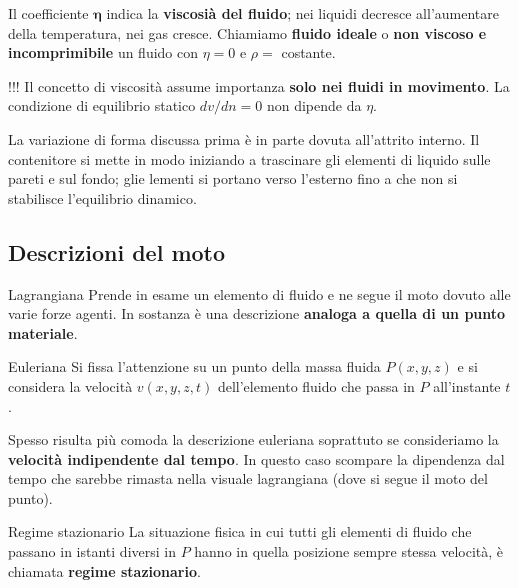 \documentclass[x11names]{report}
\begin{document}
	Il coefficiente \(\boldsymbol{\eta}\) indica la \textbf{viscosià del fluido}; nei liquidi decresce all'aumentare della temperatura, nei gas cresce. Chiamiamo \textbf{fluido ideale} o \textbf{non viscoso e incomprimibile} un fluido con \(\eta = 0\) e \(\rho = \) costante.
	
	\begin{center}
		\colorbox{attenzione}{\begin{minipage}{5.75in}
				\begin{attenzione}{!!!}
					Il concetto di viscosità assume importanza \textbf{solo nei fluidi in movimento}. La condizione di equilibrio statico  \(dv/dn = 0\) non dipende da \(\eta\).
				\end{attenzione}
		\end{minipage}}
	\end{center}
	
	\noindent
	La variazione di forma discussa prima è in parte dovuta all'attrito interno. Il contenitore si mette in modo iniziando a trascinare gli elementi di liquido sulle pareti e sul fondo; glie lementi si portano verso l'esterno fino a che non si stabilisce l'equilibrio dinamico.
	
	\subsection{Descrizioni del moto}
	\begin{center}
		\begin{minipage}{0.49\textwidth}
			\begin{es}{Lagrangiana}
				Prende in esame un elemento di fluido e ne segue il moto dovuto alle varie forze agenti. In sostanza è una descrizione \textbf{analoga a quella di un punto materiale}.
			\end{es}
		\end{minipage}
		\begin{minipage}{0.49\textwidth}
			\begin{es}{Euleriana}
				Si fissa l'attenzione su un punto della massa fluida \(P(x,y,z)\) e si considera la velocità \(v(x,y,z,t)\) dell'elemento fluido che passa in \(P\) all'instante \(t\).
			\end{es}
		\end{minipage}
	\end{center}
	Spesso risulta più comoda la descrizione euleriana soprattuto se consideriamo la \textbf{velocità indipendente dal tempo}. In questo caso scompare la dipendenza dal tempo che sarebbe rimasta nella visuale lagrangiana (dove si segue il moto del punto).
	\begin{center}
		\colorbox{yblue}{\begin{minipage}{5.75in}
				\begin{blues}{Regime stazionario}
					La situazione fisica in cui tutti gli elementi di fluido che passano in istanti diversi in \(P\) hanno in quella posizione sempre stessa velocità, è chiamata \textbf{regime stazionario}.
				\end{blues}
		\end{minipage}}
	\end{center}
	
\end{document}
